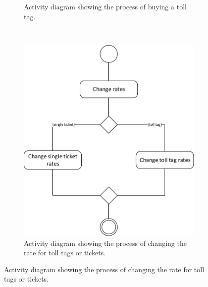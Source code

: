 \begin{figure}[H]
\begin{subfigure}[b]{0.3\textwidth}
	\caption{Activity diagram showing the process of buying a toll tag.}
	\end{subfigure}
	~
	\begin{subfigure}[b]{0.5\textwidth}
	\includegraphics[width=\textwidth]{img/activity_diagram/change_rates}
	\caption{Activity diagram showing the process of changing the rate for toll tags or tickets.}
	\end{subfigure}
\end{figure}

